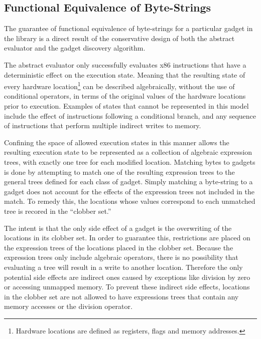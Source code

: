     \subsection{Functional Equivalence of Byte-Strings}
    \label{sec:results-gadget-inst-eq}

        The guarantee of functional equivalence of byte-strings for a
        particular gadget in the library is a direct result of the
        conservative design of both the abstract evaluator and the gadget
        discovery algorithm.

        The abstract evaluator only successfully evaluates x86 instructions
        that have a deterministic effect on the execution state.  Meaning that
        the resulting state of every hardware location\footnote{Hardware
        locations are defined as registers, flags and memory addresses.} can be
        described algebraically, without the use of conditional operators, in
        terms of the original values of the hardware locations prior to
        execution. Examples of states that cannot be represented in this model
        include the effect of instructions following a conditional branch, and
        any sequence of instructions that perform multiple indirect writes to
        memory.

        Confining the space of allowed execution states in this manner allows
        the resulting execution state to be represented as a collection of
        algebraic expression trees, with exactly one tree for each modified
        location. Matching bytes to gadgets is done by attempting to match one
        of the resulting expression trees to the general trees defined for each
        class of gadget. Simply matching a byte-string to a gadget does not
        account for the effects of the expression trees not included in the
        match.  To remedy this, the locations whose values correspond to each
        unmatched tree is recored in the ``clobber set.''

        The intent is that the only side effect of a gadget is the overwriting
        of the locations in its clobber set. In order to guarantee this,
        restrictions are placed on the expression trees of the locations placed
        in the clobber set. Because the expression trees only include algebraic
        operators, there is no possibility that evaluating a tree will result in
        a write to another location. Therefore the only potential side effects
        are indirect ones caused by exceptions like division by zero or
        accessing unmapped memory. To prevent these indirect side effects,
        locations in the clobber set are not allowed to have expressions trees
        that contain any memory accesses or the division operator.

